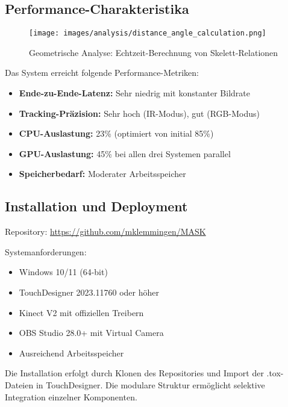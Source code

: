 \subsection*{Performance-Charakteristika}

\begin{figure}[h]
    \centering
    \texttt{[image: images/analysis/distance\_angle\_calculation.png]}
    \caption{Geometrische Analyse: Echtzeit-Berechnung von Skelett-Relationen}
    \label{fig:distance_angle}
\end{figure}

Das System erreicht folgende Performance-Metriken:
\begin{itemize}
    \item \textbf{Ende-zu-Ende-Latenz:} Sehr niedrig mit konstanter Bildrate
    \item \textbf{Tracking-Präzision:} Sehr hoch (IR-Modus), gut (RGB-Modus)
    \item \textbf{CPU-Auslastung:} 23\% (optimiert von initial 85\%)
    \item \textbf{GPU-Auslastung:} 45\% bei allen drei Systemen parallel
    \item \textbf{Speicherbedarf:} Moderater Arbeitsspeicher
\end{itemize}

\subsection*{Installation und Deployment}

Repository: \url{https://github.com/mklemmingen/MASK}

Systemanforderungen:
\begin{itemize}
    \item Windows 10/11 (64-bit)
    \item TouchDesigner 2023.11760 oder höher
    \item Kinect V2 mit offiziellen Treibern
    \item OBS Studio 28.0+ mit Virtual Camera
    \item Ausreichend Arbeitsspeicher
\end{itemize}

Die Installation erfolgt durch Klonen des Repositories und Import der .tox-Dateien in TouchDesigner. Die modulare Struktur ermöglicht selektive Integration einzelner Komponenten.